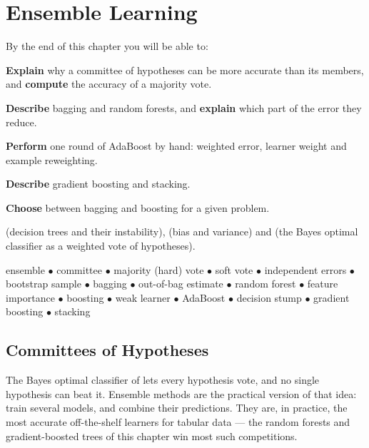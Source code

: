 \chapter{Ensemble Learning}\label{ch:ensembles}

\begin{outcomes}
By the end of this chapter you will be able to:
\begin{tight}
  \item \textbf{Explain} why a committee of hypotheses can be more accurate than
        its members, and \textbf{compute} the accuracy of a majority vote.
  \item \textbf{Describe} bagging and random forests, and \textbf{explain} which
        part of the error they reduce.
  \item \textbf{Perform} one round of AdaBoost by hand: weighted error, learner
        weight and example reweighting.
  \item \textbf{Describe} gradient boosting and stacking.
  \item \textbf{Choose} between bagging and boosting for a given problem.
\end{tight}
\end{outcomes}

\begin{prereq}
 (decision trees and their instability), 
(bias and variance) and  (the Bayes optimal classifier as a weighted
vote of hypotheses).
\end{prereq}

\begin{keyterms}
ensemble $\bullet$ committee $\bullet$ majority (hard) vote $\bullet$ soft vote
$\bullet$ independent errors $\bullet$ bootstrap sample $\bullet$ bagging
$\bullet$ out-of-bag estimate $\bullet$ random forest $\bullet$ feature importance
$\bullet$ boosting $\bullet$ weak learner $\bullet$ AdaBoost $\bullet$ decision
stump $\bullet$ gradient boosting $\bullet$ stacking
\end{keyterms}

\section{Committees of Hypotheses}

The Bayes optimal classifier of  lets every hypothesis vote, and no
single hypothesis can beat it. Ensemble methods are the practical version of that
idea: train several models, and combine their predictions. They are, in practice,
the most accurate off-the-shelf learners for tabular data --- the random forests
and gradient-boosted trees of this chapter win most such competitions.

